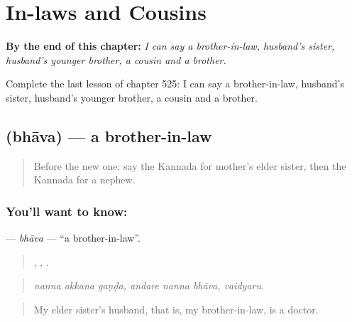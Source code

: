 
\chapter{In-laws and Cousins}
\label{ch:ka-in-laws-and-cousins}

\begin{chapteropening}
\textbf{By the end of this chapter:} \emph{I can say a brother-in-law, husband's sister, husband's younger brother, a cousin and a brother.}

Complete the last lesson of chapter 525: I can say a brother-in-law, husband's sister, husband's younger brother, a cousin and a brother.
\end{chapteropening}

\section[\texorpdfstring{\kn{ಭಾವ} (bhāva)}{ಭಾವ (bhāva)}]{ (bhāva) — a brother-in-law}

\label{lesson:KA-C525-bhava}



\begin{quote}
Before the new one: say the Kannada for mother's elder sister, then the Kannada for a nephew.
\end{quote}

\subsection*{You'll want to know: }
\textbf{} — \emph{bhāva} — \textquotedblleft{}a brother-in-law\textquotedblright{}.

\begin{quote}
  ,   , .
\end{quote}

\begin{quote}
\emph{nanna akkana gaṇḍa, andare nanna bhāva, vaidyaru.}
\end{quote}

\begin{quote}
My elder sister's husband, that is, my brother-in-law, is a doctor.
\end{quote}

